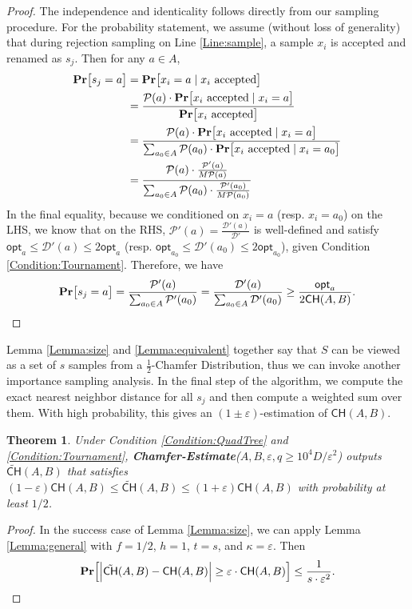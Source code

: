 \documentclass[11pt]{article}
\newcommand{\eps}{\varepsilon}
\theoremstyle{plain}
\newtheorem{theorem}{Theorem}[section]
\newcommand{\calP}{\mathcal{P}} \newcommand{\calD}{\mathcal{D}}
\newcommand{\pr}[1]{\text{\bf Pr}\normalfont\bigl[ #1 \bigr]}
\newcommand{\bpr}[1]{\text{\bf Pr}\normalfont\Bigl[ #1 \Bigr]}
\newcommand{\opt}{\mathsf{opt}}
\begin{document}
\begin{proof}
    The independence and identicality follows directly from our sampling procedure. For the probability statement, we assume (without loss of generality) that during rejection sampling on Line \ref{Line:sample}, a sample $x_i$ is accepted and renamed as $s_j$. Then for any $a \in A$,
    \begin{align*}
        \pr{s_j = a} &= \pr{x_i = a \mid x_i\text{ accepted}} \\
        &= \frac{\calP(a) \cdot \pr{x_i\text{ accepted} \mid x_i = a}}{\pr{x_i\text{ accepted}}} \\
        &= \frac{\calP(a) \cdot \pr{x_i\text{ accepted} \mid x_i = a}}{\sum_{a_0 \in A} \calP(a_0) \cdot \pr{x_i\text{ accepted} \mid x_i = a_0}} \\
        &= \frac{\calP(a) \cdot \frac{\calP'(a)}{M\calP(a)}}{\sum_{a_0 \in A} \calP(a_0) \cdot \frac{\calP'(a_0)}{M\calP(a_0)}}
    \end{align*}
In the final equality, because we conditioned on $x_i = a$ (resp. $x_i = a_0$) on the LHS, we know that on the RHS, $\calP'(a) = \frac{\calD'(a)}{\calD'}$ is well-defined and satisfy $\opt_a \leq \calD'(a) \leq 2\opt_a$ (resp. $\opt_{a_0} \leq \calD'(a_0) \leq 2\opt_{a_0}$), given Condition \ref{Condition:Tournament}. Therefore, we have
\[\pr{s_j = a} = \frac{\calP'(a)}{\sum_{a_0 \in A}\calP'(a_0)} = \frac{\calD'(a)}{\sum_{a_0 \in A}\calD'(a_0)} \geq \frac{\opt_a}{2\mathsf{CH}(A, B)}.\]
\end{proof}


Lemma \ref{Lemma:size} and \ref{Lemma:equivalent} together say that $S$ can be viewed as a set of $s$ samples from a $\frac{1}{2}$-Chamfer Distribution, thus we can invoke another importance sampling analysis. In the final step of the algorithm, we compute the exact nearest neighbor distance for all $s_j$ and then compute a weighted sum over them. With high probability, this gives an $(1\pm\eps)$-estimation of $\mathsf{CH}(A, B)$.

\begin{theorem}
    Under Condition \ref{Condition:QuadTree} and \ref{Condition:Tournament}, {\normalfont \textbf{Chamfer-Estimate}($A, B, \eps, q \geq 10^4{{D}}/\eps^2$)} outputs $\tilde{\mathsf{CH}}(A, B)$ that satisfies $(1-\eps)\mathsf{CH}(A, B) \leq \tilde{\mathsf{CH}}(A, B) \leq (1+\eps)\mathsf{CH}(A, B)$ with probability at least $1/2$.
\end{theorem}

\begin{proof}
    In the success case of Lemma \ref{Lemma:size}, we can apply Lemma \ref{Lemma:general} with $f = 1/2$, $h = 1$, $t = s$, and $\kappa = \eps$. Then 
    \[\bpr{\Bigl| \tilde{\mathsf{CH}}(A, B) - \mathsf{CH}(A, B) \Bigr| \geq \eps \cdot \mathsf{CH}(A, B)} \leq \frac{1}{s \cdot \eps^2}. \]
\end{proof}
\end{document}
